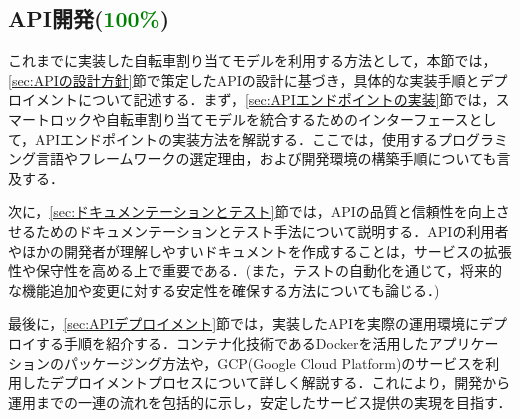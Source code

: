   \subsection{API開発(\textcolor{green}{100\%})}
    \label{sec:API開発}
      \par これまでに実装した自転車割り当てモデルを利用する方法として，本節では，\ref{sec:APIの設計方針}節で策定したAPIの設計に基づき，具体的な実装手順とデプロイメントについて記述する．まず，\ref{sec:APIエンドポイントの実装}節では，スマートロックや自転車割り当てモデルを統合するためのインターフェースとして，APIエンドポイントの実装方法を解説する．ここでは，使用するプログラミング言語やフレームワークの選定理由，および開発環境の構築手順についても言及する．
      \par 次に，\ref{sec:ドキュメンテーションとテスト}節では，APIの品質と信頼性を向上させるためのドキュメンテーションとテスト手法について説明する．APIの利用者やほかの開発者が理解しやすいドキュメントを作成することは，サービスの拡張性や保守性を高める上で重要である．(また，テストの自動化を通じて，将来的な機能追加や変更に対する安定性を確保する方法についても論じる．)
      \par 最後に，\ref{sec:APIデプロイメント}節では，実装したAPIを実際の運用環境にデプロイする手順を紹介する．コンテナ化技術であるDockerを活用したアプリケーションのパッケージング方法や，GCP(Google Cloud Platform)のサービスを利用したデプロイメントプロセスについて詳しく解説する．これにより，開発から運用までの一連の流れを包括的に示し，安定したサービス提供の実現を目指す．
      
